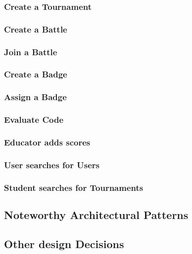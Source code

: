 \subsubsection{Create a Tournament}
\subsubsection{Create a Battle}
\subsubsection{Join a Battle}
\subsubsection{Create a Badge}
\subsubsection{Assign a Badge}
\subsubsection{Evaluate Code}
\subsubsection{Educator adds scores}
\subsubsection{User searches for Users}
\subsubsection{Student searches for Tournaments}
\subsection{Noteworthy Architectural Patterns}
\subsection{Other design Decisions}
